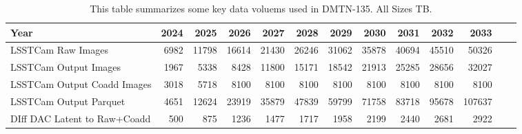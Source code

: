 \tiny \begin{longtable} { |p{}  |r  |r  |r  |r  |r  |r  |r  |r  |r  |r  |r  |r |} 
\caption{This table summarizes some key data voluems used in DMTN-135. All Sizes TB. \label{tab:sizesImages}}\\ 
\hline 
\textbf{Year}&\textbf{2024}&\textbf{2025}&\textbf{2026}&\textbf{2027}&\textbf{2028}&\textbf{2029}&\textbf{2030}&\textbf{2031}&\textbf{2032}&\textbf{2033}& \\ \hline
{LSSTCam Raw Images}&{6982}&{11798}&{16614}&{21430}&{26246}&{31062}&{35878}&{40694}&{45510}&{50326}& \\ \hline
{LSSTCam Output Images}&{1967}&{5338}&{8428}&{11800}&{15171}&{18542}&{21913}&{25285}&{28656}&{32027}& \\ \hline
{LSSTCam Output Coadd Images}&{3018}&{5718}&{8100}&{8100}&{8100}&{8100}&{8100}&{8100}&{8100}&{8100}& \\ \hline
{LSSTCam Output Parquet}&{4651}&{12624}&{23919}&{35879}&{47839}&{59799}&{71758}&{83718}&{95678}&{107637}& \\ \hline
{DIff DAC Latent to Raw+Coadd}&{500}&{875}&{1236}&{1477}&{1717}&{1958}&{2199}&{2440}&{2681}&{2922}& \\ \hline
\end{longtable} \normalsize
